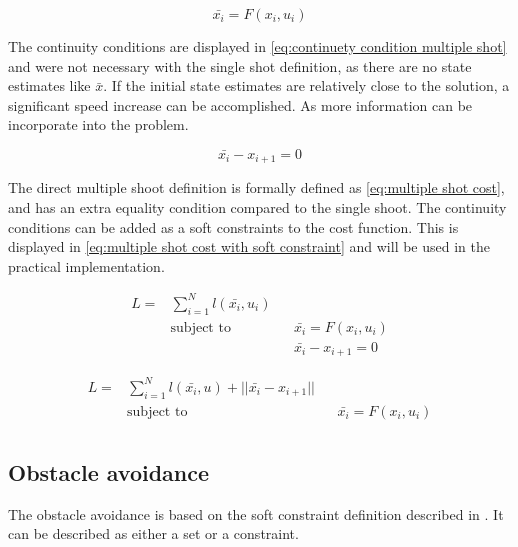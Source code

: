 			\begin{equation}
				\bar{x_i} = F(x_i,u_i)
				\label{eq:}
			\end{equation}
			
			The continuity conditions are displayed in \eqref{eq:continuety condition multiple shot} and were not necessary with the single shot definition, as there are no state estimates like $\bar{x}$. If the initial state estimates are relatively close to the solution, a significant speed increase can be accomplished. As more information can be incorporate into the problem.
			
			\begin{equation}
				\bar{x_i} - x_{i+1} = 0
				\label{eq:continuety condition multiple shot}
			\end{equation}
			
			The direct multiple shoot definition is formally defined as \eqref{eq:multiple shot cost}, and has an extra equality condition compared to the single shoot. The continuity conditions can be added as a soft constraints to the cost function. This is displayed in \eqref{eq:multiple shot cost with soft constraint} and will be used in the practical implementation.
			
			\begin{equation}
				\begin{aligned}
				L =  & \sum_{i=1}^{N} l(\bar{x_i},u_i) \\
				& \text{subject to}			&& \bar{x_i} = F(x_i,u_i) \\
				& 							&& \bar{x_i} - x_{i+1} = 0
				\end{aligned}
				\label{eq:multiple shot cost}
			\end{equation}
			
			\begin{equation}
			\begin{aligned}
			L =  & \sum_{i=1}^{N} l(\bar{x_i},u) + ||\bar{x_i} - x_{i+1}||\\
			& \text{subject to}			&& \bar{x_i} = F(x_i,u_i) \\
			\end{aligned}
			\label{eq:multiple shot cost with soft constraint}
			\end{equation}
			
		\subsection{Obstacle avoidance}
			The obstacle avoidance is based on the soft constraint definition described in \cite{AjaySathya2017}. It can be described as either a set or a constraint.
